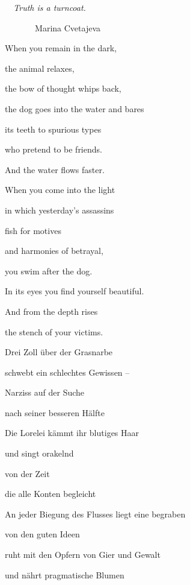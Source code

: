 \bigskip

\emph{
\ \ Truth is a turncoat.}

\emph{\ \  \ \ \ \ \ }Marina Cvetajeva


\bigskip

When you remain in the dark,

the animal relaxes,

the bow of thought whips back,

the dog goes into the water and bares

its teeth to spurious types

who pretend to be friends.


\bigskip

And the water flows faster.


\bigskip


\bigskip

When you come into the light

in which yesterday's assassins

fish for motives

and harmonies of betrayal,

you swim after the dog.

In its eyes you find yourself beautiful.


\bigskip

And from the depth rises

the stench of your victims.


\bigskip



\bigskip

Drei Zoll über der Grasnarbe

schwebt ein schlechtes Gewissen -- 

Narziss auf der Suche

nach seiner besseren Hälfte


\bigskip

Die Lorelei kämmt ihr blutiges Haar

und singt orakelnd 

von der Zeit

die alle Konten begleicht


\bigskip

An jeder Biegung des Flusses liegt eine begraben

von den guten Ideen

ruht mit den Opfern von Gier und Gewalt

und nährt pragmatische Blumen



